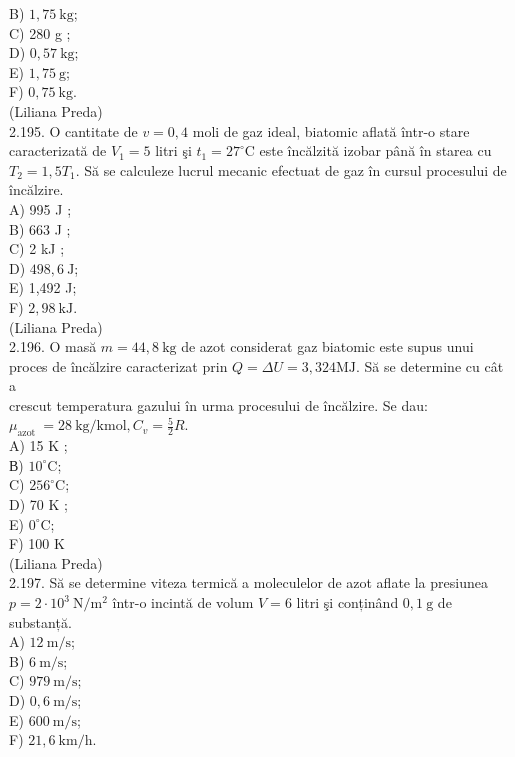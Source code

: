 \documentclass[10pt]{article}
\begin{document}
B) $1,75 \mathrm{~kg}$;\\
C) 280 g ;\\
D) $0,57 \mathrm{~kg}$;\\
E) $1,75 \mathrm{~g}$;\\
F) $0,75 \mathrm{~kg}$.\\
(Liliana Preda)\\
2.195. O cantitate de $v=0,4$ moli de gaz ideal, biatomic aflată într-o stare caracterizată de $V_{1}=5$ litri şi $t_{1}=27^{\circ} \mathrm{C}$ este încălzită izobar până în starea cu $T_{2}=1,5 T_{1}$. Să se calculeze lucrul mecanic efectuat de gaz în cursul procesului de încălzire.\\
A) 995 J ;\\
B) 663 J ;\\
C) 2 kJ ;\\
D) $498,6 \mathrm{~J}$;\\
E) 1,492 J;\\
F) $2,98 \mathrm{~kJ}$.\\
(Liliana Preda)\\
2.196. O masă $m=44,8 \mathrm{~kg}$ de azot considerat gaz biatomic este supus unui proces de încălzire caracterizat prin $Q=\Delta U=3,324 \mathrm{MJ}$. Să se determine cu cât a\\
crescut temperatura gazului în urma procesului de încălzire. Se dau: $\mu_{\text {azot }}=28 \mathrm{~kg} / \mathrm{kmol}, C_{v}=\frac{5}{2} R$.\\
A) 15 K ;\\
В) $10^{\circ} \mathrm{C}$;\\
C) $256^{\circ} \mathrm{C}$;\\
D) 70 K ;\\
E) $0^{\circ} \mathrm{C}$;\\
F) 100 K\\
(Liliana Preda)\\
2.197. Să se determine viteza termică a moleculelor de azot aflate la presiunea $p=2 \cdot 10^{3} \mathrm{~N} / \mathrm{m}^{2}$ într-o incintă de volum $V=6$ litri şi conținând $0,1 \mathrm{~g}$ de substanță.\\
A) $12 \mathrm{~m} / \mathrm{s}$;\\
B) $6 \mathrm{~m} / \mathrm{s}$;\\
C) $979 \mathrm{~m} / \mathrm{s}$;\\
D) $0,6 \mathrm{~m} / \mathrm{s}$;\\
E) $600 \mathrm{~m} / \mathrm{s}$;\\
F) $21,6 \mathrm{~km} / \mathrm{h}$.\\
\end{document}
